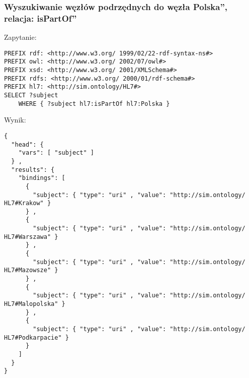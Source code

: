 \subsubsection{Wyszukiwanie węzłów podrzędnych do węzła \quotedblbase Polska\textquotedblright, relacja: \quotedblbase isPartOf\textquotedblright }

Zapytanie:
\begin{lstlisting}
PREFIX rdf: <http://www.w3.org/ 1999/02/22-rdf-syntax-ns#>
PREFIX owl: <http://www.w3.org/ 2002/07/owl#>
PREFIX xsd: <http://www.w3.org/ 2001/XMLSchema#>
PREFIX rdfs: <http://www.w3.org/ 2000/01/rdf-schema#>
PREFIX hl7: <http://sim.ontology/HL7#>
SELECT ?subject
	WHERE { ?subject hl7:isPartOf hl7:Polska }
\end{lstlisting}

Wynik:
\begin{lstlisting}
{
  "head": {
    "vars": [ "subject" ]
  } ,
  "results": {
    "bindings": [
      {
        "subject": { "type": "uri" , "value": "http://sim.ontology/ HL7#Krakow" }
      } ,
      {
        "subject": { "type": "uri" , "value": "http://sim.ontology/ HL7#Warszawa" }
      } ,
      {
        "subject": { "type": "uri" , "value": "http://sim.ontology/ HL7#Mazowsze" }
      } ,
      {
        "subject": { "type": "uri" , "value": "http://sim.ontology/ HL7#Malopolska" }
      } ,
      {
        "subject": { "type": "uri" , "value": "http://sim.ontology/ HL7#Podkarpacie" }
      }
    ]
  }
}

\end{lstlisting}
